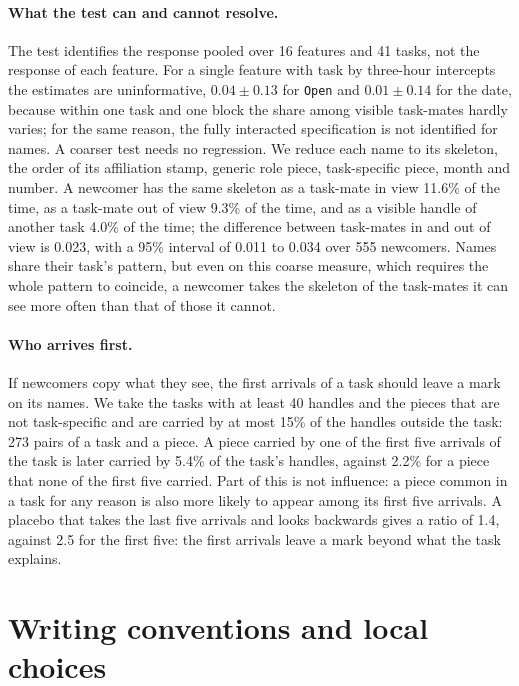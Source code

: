 \documentclass[10pt]{article}
\begin{document}
\paragraph{What the test can and cannot resolve.} The test identifies the response pooled over 16 features and 41 tasks, not the response of each feature. For a single feature with task by three-hour intercepts the estimates are uninformative, $0.04 \pm 0.13$ for \texttt{Open} and $0.01 \pm 0.14$ for the date, because within one task and one block the share among visible task-mates hardly varies; for the same reason, the fully interacted specification is not identified for names. A coarser test needs no regression. We reduce each name to its skeleton, the order of its affiliation stamp, generic role piece, task-specific piece, month and number. A newcomer has the same skeleton as a task-mate in view 11.6\% of the time, as a task-mate out of view 9.3\% of the time, and as a visible handle of another task 4.0\% of the time; the difference between task-mates in and out of view is 0.023, with a 95\% interval of 0.011 to 0.034 over 555 newcomers. Names share their task's pattern, but even on this coarse measure, which requires the whole pattern to coincide, a newcomer takes the skeleton of the task-mates it can see more often than that of those it cannot.

\paragraph{Who arrives first.} If newcomers copy what they see, the first arrivals of a task should leave a mark on its names. We take the tasks with at least 40 handles and the pieces that are not task-specific and are carried by at most 15\% of the handles outside the task: 273 pairs of a task and a piece. A piece carried by one of the first five arrivals of the task is later carried by 5.4\% of the task's handles, against 2.2\% for a piece that none of the first five carried. Part of this is not influence: a piece common in a task for any reason is also more likely to appear among its first five arrivals. A placebo that takes the last five arrivals and looks backwards gives a ratio of 1.4, against 2.5 for the first five: the first arrivals leave a mark beyond what the task explains.

\clearpage
\section{Writing conventions and local choices}\label{sec:forms}
\end{document}
